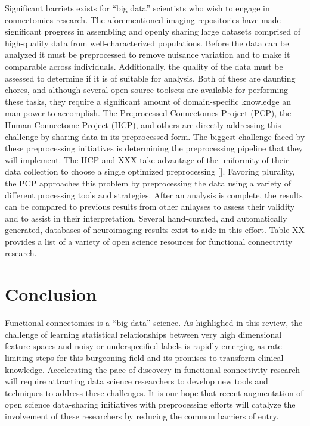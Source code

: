 Significant barriets exists for ``big data'' scientists who wish to engage in connectomics research. The aforementioned imaging repositories have made significant progress in assembling and openly sharing large datasets comprised of high-quality data from well-characterized populations. Before the data can be analyzed it must be preprocessed to remove nuisance variation and to make it comparable across individuals. Additionally, the quality of the data must be assessed to determine if it is of suitable for analysis. Both of these are daunting chores, and although several open source toolsets are available for performing these tasks, they require a significant amount of domain-specific knowledge an man-power to accomplish. The Preprocessed Connectomes Project (PCP), the Human Connectome Project (HCP), and others are directly addressing this challenge by sharing data in its preprocessed form. The biggest challenge faced by these preprocessing initiatives is determining the preprocessing pipeline that they will implement. The HCP and XXX take advantage of the uniformity of their data collection to choose a single optimized preprocessing []. Favoring plurality, the PCP approaches this problem by preprocessing the data using a variety of different processing tools and strategies. After an analysis is complete, the results can be compared to previous results from other anlayses to assess their validity and to assist in their interpretation. Several hand-curated, and automatically generated, databases of neuroimaging results exist to aide in this effort. Table XX provides a list of a variety of open science resources for functional connectivity research.  


\section {Conclusion}
Functional connectomics is a ``big data'' science. As highlighed in this review, the challenge of learning statistical relationships between very high dimensional feature spaces and noisy or underspecified labels is rapidly emerging as rate-limiting steps for this burgeoning field and its promises to transform clinical knowledge. Accelerating the pace of discovery in functional connectivity research will require attracting data science researchers to develop new tools and techniques to address these challenges. It is our hope that recent augmentation of open science data-sharing initiatives with preprocessing efforts will catalyze the involvement of these researchers by reducing the common barriers of entry. 




